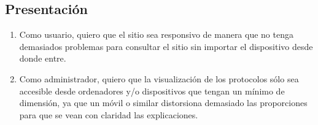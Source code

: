 \subsection{Presentación}

\begin{enumerate}
    \item Como usuario, quiero que el sitio sea responsivo de manera que no tenga demasiados problemas para consultar el sitio sin importar el dispositivo desde donde entre.

    \item Como administrador, quiero que la visualización de los protocolos sólo sea accesible desde ordenadores y/o dispositivos que tengan un mínimo de dimensión, ya que un móvil o similar distorsiona demasiado las proporciones para que se vean con claridad las explicaciones.
\end{enumerate}